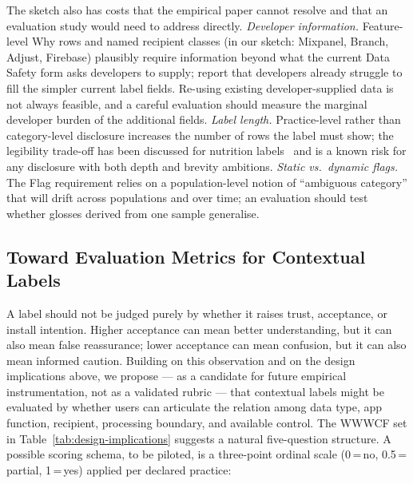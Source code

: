 \documentclass[11pt,a4paper]{article}
\begin{document}
The sketch also has costs that the empirical paper cannot resolve and
that an evaluation study would need to address directly.
\emph{Developer information.} Feature-level Why rows and named
recipient classes (in our sketch: Mixpanel, Branch, Adjust, Firebase)
plausibly require information beyond what the current Data Safety
form asks developers to supply; \citet{bhagavatula:etal:2023} report
that developers already struggle to fill the simpler current label
fields. Re-using existing developer-supplied data is not always
feasible, and a careful evaluation should measure the marginal
developer burden of the additional fields. \emph{Label length.}
Practice-level rather than category-level disclosure increases the
number of rows the label must show; the legibility trade-off has been
discussed for nutrition labels~\citep{kelley:etal:2010,cranor:2012}
and is a known risk for any disclosure with both depth and brevity
ambitions. \emph{Static vs.\ dynamic flags.} The Flag requirement
relies on a population-level notion of ``ambiguous category'' that
will drift across populations and over time; an evaluation should
test whether glosses derived from one sample generalise.

\subsection{Toward Evaluation Metrics for Contextual Labels}
\label{sec:evaluation-metrics}

A label should not be judged purely by whether it raises trust,
acceptance, or install intention. Higher acceptance can mean better
understanding, but it can also mean false reassurance; lower
acceptance can mean confusion, but it can also mean informed caution.
Building on this observation and on the design implications above, we
propose --- as a candidate for future empirical instrumentation, not
as a validated rubric --- that contextual labels might be evaluated by
whether users can articulate the relation among data type, app
function, recipient, processing boundary, and available control. The
WWWCF set in Table~\ref{tab:design-implications} suggests a natural
five-question structure. A possible scoring schema, to be piloted, is
a three-point ordinal scale (0\,=\,no, 0.5\,=\,partial, 1\,=\,yes)
applied per declared practice:
\end{document}
